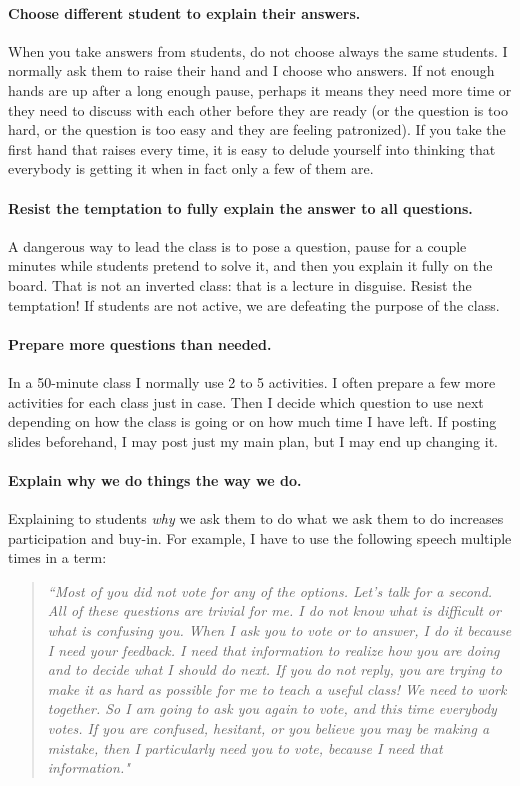 \documentclass[11pt]{article}
\begin{document}
	\paragraph{Choose different student to explain their answers.}
	When you take answers from students, do not choose always the same students. I
	normally ask them to raise their hand and I choose who answers. If not enough
	hands are up after a long enough pause, perhaps it means they need more time or
	they need to discuss with each other before they are ready (or the question is
	too hard, or the question is too easy and they are feeling patronized). If you
	take the first hand that raises every time, it is easy to delude yourself into
	thinking that everybody is getting it when in fact only a few of them are.
	\paragraph{Resist the temptation to fully explain the answer to all questions.}
	A dangerous way to lead the class is to pose a question, pause for a couple minutes
	while students pretend to solve it, and then you explain it fully on the board.
	That is not an inverted class: that is a lecture in disguise. Resist the temptation!
	If students are not active, we are defeating the purpose of the class.
	\paragraph{Prepare more questions than needed.}
	In a 50-minute class I normally use 2 to 5 activities. I often prepare a few
	more activities for each class just in case. Then I decide which question to use
	next depending on how the class is going or on how much time I have left. If
	posting slides beforehand, I may post just my main plan, but I may end up
	changing it.

	\paragraph{Explain why we do things the way we do.}
	Explaining to students \emph{why} we ask them to do what we ask them to do
	increases participation and buy-in. For example, I have to use the following
	speech multiple times in a term:

	\begin{quote}
		\emph{``Most of you did not vote for any of the options. Let's talk for a second.
		All of these questions are trivial for me. I do not know what is difficult or
		what is confusing you. When I ask you to vote or to answer, I do it because I
		need your feedback. I need that information to realize how you are doing and
		to decide what I should do next. If you do not reply, you are trying to make
		it as hard as possible for me to teach a useful class! We need to work together.
		So I am going to ask you again to vote, and this time everybody votes. If
		you are confused, hesitant, or you believe you may be making a mistake, then
		I particularly need you to vote, because I need that information."}
	\end{quote}
\end{document}
